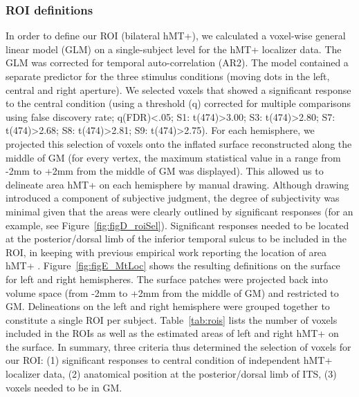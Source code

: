 \subsubsection{ROI definitions}
In order to define our ROI (bilateral hMT+), we calculated a voxel-wise general linear model (GLM) on a single-subject level for the hMT+ localizer data. The GLM was corrected for temporal auto-correlation (AR2). The model contained a separate predictor for the three stimulus conditions (moving dots in the left, central and right aperture). We selected voxels that showed a significant response to the central condition (using a threshold (q) corrected for multiple comparisons using false discovery rate; q(FDR)\textless.05; S1: t(474)\textgreater3.00; S3: t(474)\textgreater2.80; S7: t(474)\textgreater2.68; S8: t(474)\textgreater2.81; S9: t(474)\textgreater2.75). For each hemisphere, we projected this selection of voxels onto the inflated surface reconstructed along the middle of GM (for every vertex, the maximum statistical value in a range from -2mm to +2mm from the middle of GM was displayed). This allowed us to delineate area hMT+ on each hemisphere by manual drawing. Although drawing introduced a component of subjective judgment, the degree of subjectivity was minimal given that the areas were clearly outlined by significant responses (for an example, see Figure~\ref{fig:figD_roiSel}). Significant responses needed to be located at the posterior/dorsal limb of the inferior temporal sulcus to be included in the ROI, in keeping with previous empirical work reporting the location of area hMT+ \parencite{Dumoulin2000, Huk2002, Kolster2010}. Figure~\ref{fig:figE_MtLoc} shows the resulting definitions on the surface for left and right hemispheres. The surface patches were projected back into volume space (from -2mm to +2mm from the middle of GM) and restricted to GM. Delineations on the left and right hemisphere were grouped together to constitute a single ROI per subject. Table~\ref{tab:rois} lists the number of voxels included in the ROIs as well as the estimated areas of left and right hMT+ on the surface. In summary, three criteria thus determined the selection of voxels for our ROI: (1) significant responses to central condition of independent hMT+ localizer data, (2) anatomical position at the posterior/dorsal limb of ITS, (3) voxels needed to be in GM.

